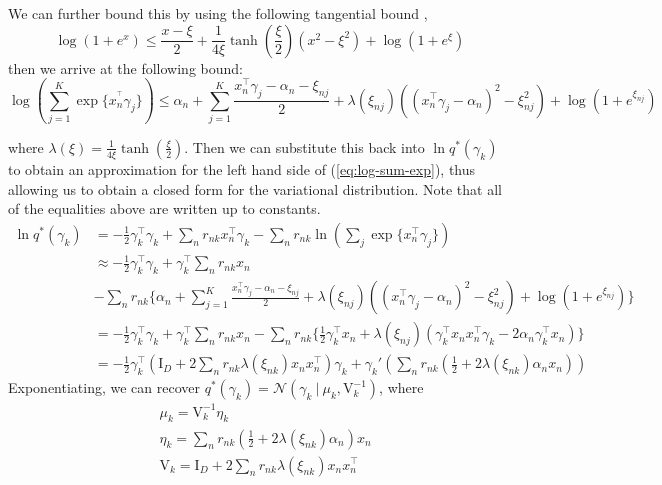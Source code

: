 \documentclass[twoside,11pt]{article}
\newcommand{\tr}{\intercal}
\newcommand{\eye}{\mathrm{I}}
\newcommand\given[1][]{\:#1\vert\:}
\begin{document}
We can further bound this by using the following tangential bound \parencite{jj:2001}, $$\log(1 + e^x) \leq \frac{x - \xi}{2} + \frac{1}{4\xi} \tanh \left( \frac{\xi}{2} \right) (x^2 - \xi^2) + \log\left(1 + e^{\xi}\right)$$ then we arrive at the following bound: 
\begin{equation} \label{eq:jj_bound}
	\log \left( \sum_{j = 1}^K \exp\{ x_n^{^\intercal} \gamma_j \}\right) \leq 
\alpha_n + \sum_{j = 1}^K \frac{x_n^{\intercal} \gamma_j - \alpha_n - \xi_{nj}}{2} + \lambda(\xi_{nj}) \left( (x_n^{\intercal} \gamma_j - \alpha_n)^2 - \xi_{nj}^2\right) + \log \left( 1 + e^{\xi_{nj}}\right)
\end{equation}

where $\lambda(\xi) = \frac{1}{4\xi} \tanh \left( \frac{\xi}{2} \right)$. Then we can substitute this back into $\ln q^{*}(\gamma_k)$ to obtain an approximation for the left hand side of (\ref{eq:log-sum-exp}), thus allowing us to obtain a closed form for the variational distribution. Note that all of the equalities above are written up to constants.
\begin{align*}
    \ln q^{*}(\gamma_k) &= - \frac{1}{2} \gamma_k^{\tr} \gamma_k + \sum_{n} r_{nk} x_n^{\intercal} \gamma_k  - \sum_n r_{nk} \ln \left( \sum_j \exp\{x_n^{\intercal} \gamma_j \} \right)  \\
    & \approx - \frac{1}{2} \gamma_k^{\tr} \gamma_k + \gamma_k^{\intercal} \sum_{n} r_{nk} x_n \\
    & - \sum_n r_{nk} \Bigg\{ \alpha_n + \sum_{j = 1}^K \frac{x_n^{\intercal} \gamma_j - \alpha_n - \xi_{nj}}{2} + \lambda(\xi_{nj}) \left( (x_n^{\intercal} \gamma_j - \alpha_n)^2 - \xi_{nj}^2\right) + \log \left( 1 + e^{\xi_{nj}}\right) \Bigg\} \\
    & = - \frac{1}{2} \gamma_k^{\tr} \gamma_k + \gamma_k^{\intercal} \sum_{n} r_{nk} x_n - \sum_n r_{nk} \Bigg\{ \frac{1}{2} \gamma_k^{\tr} x_n + \lambda\left( \xi_{nj} \right) \left( \gamma_k^{\tr}x_n x_n^{\tr} \gamma_k - 2\alpha_n \gamma_k^{\tr} x_n \right)\Bigg\} \\
    &= -\frac{1}{2} \gamma_k^{\tr} \left(\eye_D  + 2 \sum_n r_{nk} \lambda(\xi_{nk}) x_n x_n^{\tr} \right) \gamma_k + \gamma_k' \left( \sum_n r_{nk} \left(\frac{1}{2} + 2 \lambda \left( \xi_{nk}\right) \alpha_n  x_n\right) \right)
\end{align*}
Exponentiating, we can recover $q^{*}(\gamma_k) = \mathcal{N} \left(\gamma_k \given \mu_k, \mathrm{V}_k^{-1} \right)$, where
\begin{equation} \label{eq:gamma_params}
\begin{split}
	& \mu_k = \mathrm{V}_k^{-1} \eta_k \\
	& \eta_k = \sum_{n} r_{nk} \left( \frac{1}{2} + 2 \lambda(\xi_{nk}) \alpha_n \right) x_n \\
	& \mathrm{V}_k = \eye_D + 2 \sum_{n} r_{nk} \lambda(\xi_{nk}) x_n x_n^{\tr}
\end{split}
\end{equation}
\end{document}
